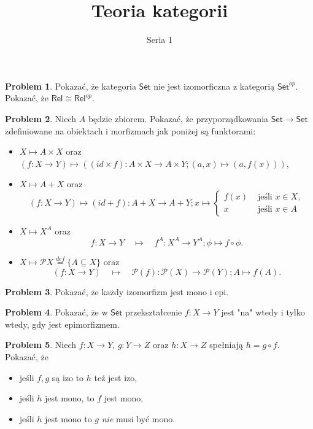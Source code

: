 \documentclass[10pt]{amsart}
\title{Teoria kategorii}
\author{Seria 1}
\theoremstyle{plain}
\theoremstyle{definition}
\newtheorem{problem}{Problem}
\numberwithin{equation}{section}
\begin{document}
\maketitle
\begin{problem}
Pokazać, że kategoria $\mathsf{Set}$ nie jest izomorficzna z kategorią $\mathsf{Set}^{op}$. Pokazać, że $\mathsf{Rel}\cong \mathsf{Rel}^{op}$. 
\end{problem}


\begin{problem}
Niech $A$ będzie zbiorem. Pokazać, że przyporządkowania $\mathsf{Set}\to \mathsf{Set}$ zdefiniowane na obiektach i morfizmach jak poniżej są funktorami:
\begin{itemize}
\item $X\mapsto A\times X$ oraz $(f:X\to Y)\mapsto \left ((id \times f):A\times X\to A\times Y; (a,x)\mapsto (a,f(x))\right )$,
\item $X\mapsto A+ X$ oraz $$(f:X\to Y)\mapsto (id + f):A+ X\to A+ Y; x \mapsto \left \{ \begin{array}{cc}f(x)  &\text{ jeśli }x\in X, \\ x &\text{ jeśli }x\in A \end{array}\right. $$
\item $X\mapsto X^A$ oraz 
$$
f:X\to Y\quad \mapsto \quad f^A:X^A\to Y^A; \phi\mapsto f\circ \phi. 
$$
\item $X\mapsto \mathcal{P}X\stackrel{def}{=} \{ A\subseteq X \}$ oraz 
$$
(f:X\to Y)\quad \mapsto \quad \mathcal{P}(f):\mathcal{P}(X)\to \mathcal{P}(Y); A\mapsto f(A). 
$$
\end{itemize}
\end{problem}

\begin{problem}
Pokazać, że każdy izomorfizm jest mono i epi.
\end{problem}

\begin{problem}
Pokazać, że w $\mathsf{Set}$ przekształcenie $f:X\to Y$ jest "na" wtedy i tylko wtedy, gdy jest epimorfizmem.
\end{problem}


\begin{problem}
Niech $f:X\to Y$, $g:Y\to Z$ oraz $h:X\to Z$ spełniają $h= g\circ f$. Pokazać, że 
\begin{itemize}
\item jeśli $f,g$ są izo to $h$ też jest izo,
\item jeśli $h$ jest mono, to $f$ jest mono,
\item jeśli $h$ jest mono to $g$ \emph{nie} musi być mono.
\end{itemize}
\end{problem}
\end{document}
